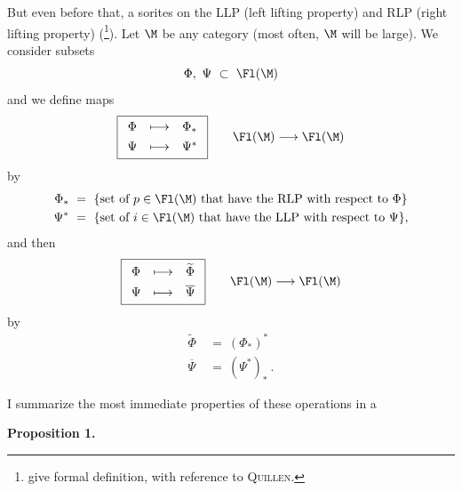 But even before that, a sorites on the LLP (left lifting property) and RLP (right lifting property) (\footnote[1]{give formal definition, with reference to \textsc{Quillen}.}). Let $\M$ be any category (most often, $\M$ will be large). We consider subsets
\[
\Phi,\ \Psi\ \subset\ \Fl(\M)
\]
and we define maps
\[
\boxed{\begin{array}{ccc}
\Phi & \longmapsto & \Phi_* \\[1ex]
\Psi & \longmapsto & \Psi^*
\end{array}}
\qquad
\Fl(\M) \longrightarrow \Fl(\M)
\]
 by %
\[
\begin{aligned}
\Phi_* \ &= \ \{\text{set of } p \in \Fl(\M) \text{ that have the RLP with respect to } \Phi\} \\
\Psi^* \ &= \ \{\text{set of } i \in \Fl(\M) \text{ that have the LLP with respect to } \Psi\},
\end{aligned}
\]
and then
\[
\boxed{\begin{array}{ccc}
\Phi & \longmapsto & \widetilde{\Phi} \\[1ex]
\Psi & \longmapsto & \overline{\Psi}
\end{array}}
\qquad
\Fl(\M) \longrightarrow \Fl(\M)
\]
 by %
\[
\begin{aligned}
\widetilde{\Phi} \ &= \ (\Phi_*)^* \\
\overline{\Psi} \ &= \ (\Psi^*)_* \ .
\end{aligned}
\]


I summarize the most immediate properties of these operations in a

\noindent\textbf{Proposition 1.}

